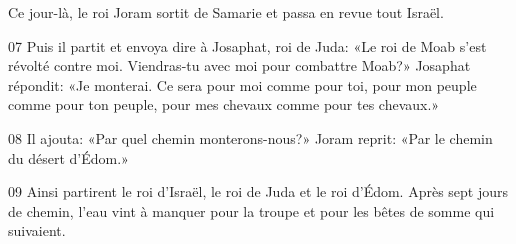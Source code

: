 Ce jour-là, le roi Joram sortit de Samarie et passa en revue tout Israël.

07 Puis il partit et envoya dire à Josaphat, roi de Juda: «Le roi de Moab s’est révolté contre moi. Viendras-tu avec moi pour combattre Moab?» Josaphat répondit: «Je monterai. Ce sera pour moi comme pour toi, pour mon peuple comme pour ton peuple, pour mes chevaux comme pour tes chevaux.»

08 Il ajouta: «Par quel chemin monterons-nous?» Joram reprit: «Par le chemin du désert d’Édom.»

09 Ainsi partirent le roi d’Israël, le roi de Juda et le roi d’Édom. Après sept jours de chemin, l’eau vint à manquer pour la troupe et pour les bêtes de somme qui suivaient.
